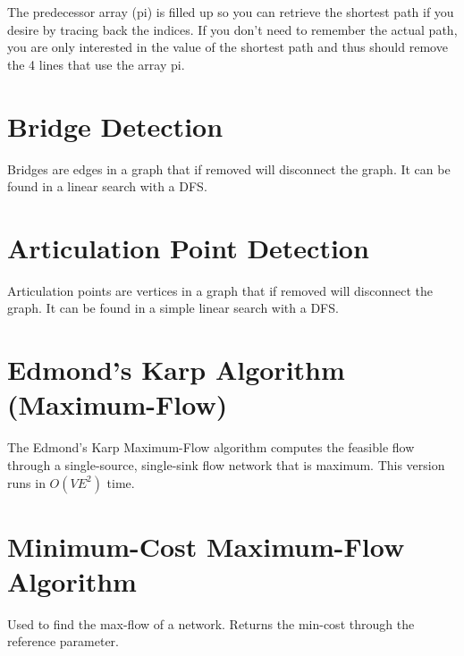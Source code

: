     The predecessor array (pi) is filled up so you can retrieve the shortest 
    path if you desire by tracing back the indices. If you don't need to 
    remember the actual path, you are only interested in the value of the 
    shortest path and thus should remove the 4 lines that use the array pi.
    
    

	\section{Bridge Detection}
	
	Bridges are edges in a graph that if removed will disconnect the graph. It 
	can be found in a linear search with a DFS.
	
	
	
	\section{Articulation Point Detection}
	
	Articulation points are vertices in a graph that if removed will disconnect 
	the graph. It can be found in a simple linear search with a DFS.
	
	
	
	\section{Edmond's Karp Algorithm (Maximum-Flow)}
	
	The Edmond's Karp Maximum-Flow algorithm computes the feasible flow through 
	a single-source, single-sink flow network that is maximum.  This version 
	runs in $O(VE^2)$ time.
	
	
	
	\section{Minimum-Cost Maximum-Flow Algorithm}
	
	Used to find the max-flow of a network. Returns the min-cost through the 
	reference parameter.
	
	
	
